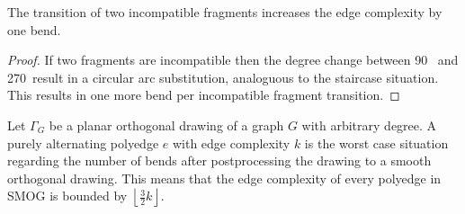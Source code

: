 \begin{lemma}
	The transition of two incompatible fragments increases the edge complexity by one bend.\label{lem:transition}
\end{lemma}
\begin{proof}
	If two fragments are incompatible then the degree change between 90\degree~ and 270\degree~result in a circular arc substitution, analoguous to the staircase situation. This results in one more bend per incompatible fragment transition.
\end{proof}
\begin{lemma}
	Let $\Gamma_G$ be a planar orthogonal drawing of a graph $G$ with arbitrary degree. A purely alternating polyedge $e$ with edge complexity $k$ is the worst case situation regarding the number of bends after postprocessing the drawing to a smooth orthogonal drawing. This means that the edge complexity of every polyedge in SMOG is bounded by $\left\lfloor\frac{3}{2}k\right\rfloor$. \label{lem:ec_bound}
\end{lemma}
